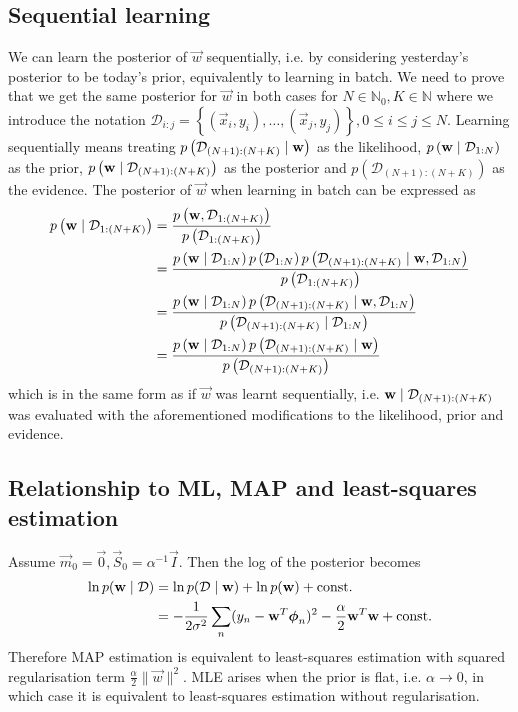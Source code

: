 \subsection{Sequential learning}
We can learn the posterior of $\vec w$ sequentially, i.e. by considering yesterday's posterior to be today's prior, equivalently to learning in batch. We need to prove that we get the same posterior for $\vec w$ in both cases for $N \in \mathbb N_0, K \in \mathbb N$ where we introduce the notation $\mathcal D_{i:j} = \left\{(\vec x_i, y_i), \dotsc, (\vec x_j, y_j)\right\}, 0 \leq i \leq j \leq N$. Learning sequentially means treating $p\left(\mathcal D_{(N + 1):(N + K)} \mid \boldsymbol{\mathbf{w}}\right)$ as the likelihood, $p\left(\boldsymbol{\mathbf{w}} \mid \mathcal D_{1:N}\right)$ as the prior, $p\left(\boldsymbol{\mathbf{w}} \mid \mathcal D_{(N + 1):(N + K)}\right)$ as the posterior and $p\left(\mathcal D_{(N + 1):(N + K)}\right)$ as the evidence. The posterior of $\vec w$ when learning in batch can be expressed as
\begin{align*}
	p\left(\boldsymbol{\mathbf{w}} \mid \mathcal D_{1:(N + K)}\right) 	&= \frac{p\left(\boldsymbol{\mathbf{w}}, \mathcal D_{1:(N + K)}\right)}{p\left(\mathcal D_{1:(N + K)}\right)} \\
														&= \frac{p\left(\boldsymbol{\mathbf{w}} \mid \mathcal D_{1:N}\right) p\left(\mathcal D_{1:N}\right) p\left(\mathcal D_{(N + 1):(N + K)} \mid \boldsymbol{\mathbf{w}}, \mathcal D_{1:N}\right)}{p\left(\mathcal D_{1:(N + K)}\right)} \\
														&= \frac{p\left(\boldsymbol{\mathbf{w}} \mid \mathcal D_{1:N}\right) p\left(\mathcal D_{(N + 1):(N + K)} \mid \boldsymbol{\mathbf{w}}, \mathcal D_{1:N}\right)}{p\left(\mathcal D_{(N + 1):(N + K)} \mid \mathcal D_{1:N}\right)} \\
														&= \frac{p\left(\boldsymbol{\mathbf{w}} \mid \mathcal D_{1:N}\right) p\left(\mathcal D_{(N + 1):(N + K)} \mid \boldsymbol{\mathbf{w}}\right)}{p\left(\mathcal D_{(N + 1):(N + K)}\right)}
\end{align*}
which is in the same form as if $\vec w$ was learnt sequentially, i.e. $\boldsymbol{\mathbf{w}} \mid \mathcal D_{(N + 1):(N + K)}$ was evaluated with the aforementioned modifications to the likelihood, prior and evidence.

\subsection{Relationship to ML, MAP and least-squares estimation}
Assume $\vec m_0 = \vec 0, \vec S_0 = \alpha^{-1} \vec I$. Then the log of the posterior becomes
\begin{align*}
	\ln p(\boldsymbol{\mathbf{w}} \mid \mathcal D) 	&= \ln p(\mathcal D \mid \boldsymbol{\mathbf{w}}) + \ln p(\boldsymbol{\mathbf{w}}) + \text{const.} \\
										&= -\frac{1}{2\sigma^2} \sum_n (y_n - \boldsymbol{\mathbf{w}}^T \boldsymbol{\mathbf{\phi}}_n)^2 - \frac{\alpha}{2} \boldsymbol{\mathbf{w}}^T \boldsymbol{\mathbf{w}} + \text{const.}
\end{align*}
Therefore MAP estimation is equivalent to least-squares estimation with squared regularisation term $\frac{\alpha}{2}\|\vec w\|^2$. MLE arises when the prior is flat, i.e. $\alpha \to 0$, in which case it is equivalent to least-squares estimation without regularisation.